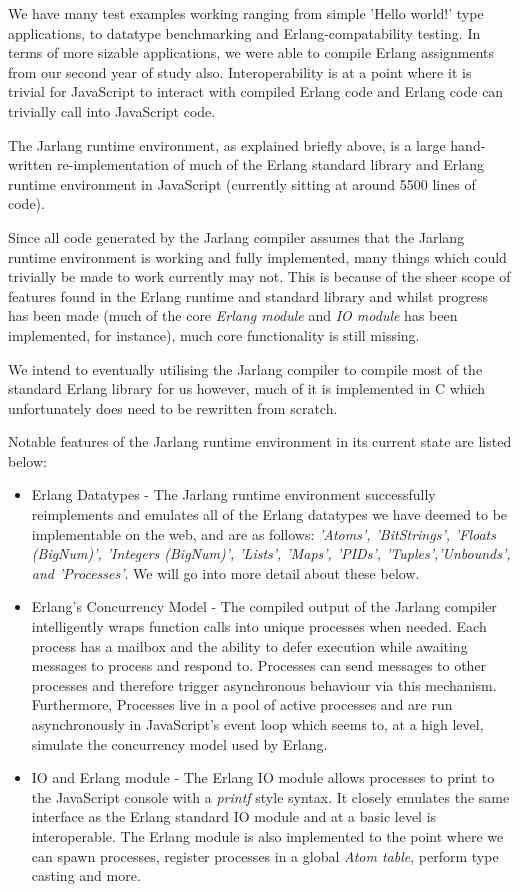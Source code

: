 \documentclass[twoside,12pt,titlepage,a4paper]{article}
\begin{document}
We have many test examples working ranging from simple 'Hello world!' type applications, to datatype benchmarking and Erlang-compatability testing. In terms of more sizable applications, we were able to compile Erlang assignments from our second year of study also. Interoperability is at a point where it is trivial for JavaScript to interact with compiled Erlang code and Erlang code can trivially call into JavaScript code.

The Jarlang runtime environment, as explained briefly above, is a large hand-written re-implementation of much of the Erlang standard library and Erlang runtime environment in JavaScript (currently sitting at around 5500 lines of code). 

Since all code generated by the Jarlang compiler assumes that the Jarlang runtime environment is working and fully implemented, many things which could trivially be made to work currently may not. This is because of the sheer scope of features found in the Erlang runtime and standard library and whilst progress has been made (much of the core \textit{Erlang module} and \textit{IO module} has been implemented, for instance), much core functionality is still missing.

We intend to eventually utilising the Jarlang compiler to compile most of the standard Erlang library for us however, much of it is implemented in C which unfortunately does need to be rewritten from scratch. 

Notable features of the Jarlang runtime environment in its current state are listed below:

\begin{itemize}
	\item Erlang Datatypes - The Jarlang runtime environment successfully reimplements and emulates all of the Erlang datatypes we have deemed to be implementable on the web, and are as follows: \textit{'Atoms', 'BitStrings', 'Floats (BigNum)', 'Integers (BigNum)', 'Lists', 'Maps', 'PIDs', 'Tuples','Unbounds', and 'Processes'}. We will go into more detail about these below.
	\item Erlang's Concurrency Model - The compiled output of the Jarlang compiler intelligently wraps function calls into unique processes when needed. Each process has a mailbox and the ability to defer execution while awaiting messages to process and respond to. Processes can send messages to other processes and therefore trigger asynchronous behaviour via this mechanism. Furthermore, Processes live in a pool of active processes and are run asynchronously in JavaScript's event loop which seems to, at a high level, simulate the concurrency model used by Erlang.
	\item IO and Erlang module - The Erlang IO module allows processes to print to the JavaScript console with a \textit{printf} style syntax. It closely emulates the same interface as the Erlang standard IO module and at a basic level is interoperable. The Erlang module is also implemented to the point where we can spawn processes, register processes in a global \textit{Atom table}, perform type casting and more.
\end{itemize}
\end{document}
